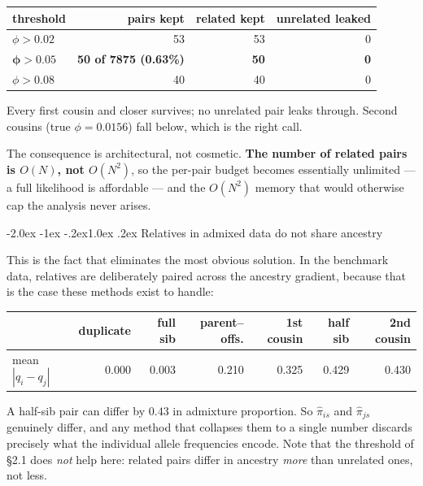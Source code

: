 \documentclass[10pt,a4paper]{article}
\makeatletter
\renewcommand\subsection{\@startsection{subsection}{2}{\z@}%
  {-2.0ex \@plus -1ex \@minus -.2ex}{1.0ex \@plus.2ex}%
  {\normalfont\normalsize\bfseries\color{hdr}}}
\makeatother
\begin{document}
\begin{center}
\small
\begin{tabular}{@{}lrrr@{}}
\toprule
threshold & pairs kept & related kept & unrelated leaked \\
\midrule
$\phi>0.02$ & 53 & 53 & 0 \\
$\boldsymbol{\phi>0.05}$ & \textbf{50 of 7875 (0.63\%)} & \textbf{50} & \textbf{0} \\
$\phi>0.08$ & 40 & 40 & 0 \\
\bottomrule
\end{tabular}
\end{center}

\noindent
Every first cousin and closer survives; no unrelated pair leaks through. Second cousins (true
$\phi=0.0156$) fall below, which is the right call.

The consequence is architectural, not cosmetic. \textbf{The number of related pairs is $O(N)$, not $O(N^2)$},
so the per-pair budget becomes essentially unlimited --- a full likelihood is affordable --- and the
$O(N^2)$ memory that would otherwise cap the analysis never arises.

\subsection{Relatives in admixed data do not share ancestry}

This is the fact that eliminates the most obvious solution. In the benchmark data, relatives are
deliberately paired across the ancestry gradient, because that is the case these methods exist to handle:

\begin{center}
\small
\begin{tabular}{@{}lrrrrrr@{}}
\toprule
 & duplicate & full sib & parent--offs. & 1st cousin & half sib & 2nd cousin \\
\midrule
mean $|q_i-q_j|$ & 0.000 & 0.003 & 0.210 & 0.325 & 0.429 & 0.430 \\
\bottomrule
\end{tabular}
\end{center}

\noindent
A half-sib pair can differ by $0.43$ in admixture proportion. So $\hat\pi_{is}$ and $\hat\pi_{js}$ genuinely
differ, and any method that collapses them to a single number discards precisely what the individual allele
frequencies encode. Note that the threshold of \S2.1 does \emph{not} help here: related pairs differ in
ancestry \emph{more} than unrelated ones, not less.
\end{document}
